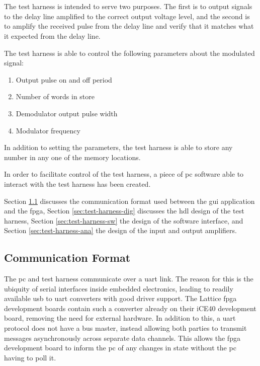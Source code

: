 \chapter{} \label{sec:test-harness-design}

The test harness is intended to serve two purposes. The first is to output signals to the delay line amplified to the correct output voltage level, and the second is to amplify the received pulse from the delay line and verify that it matches what it expected from the delay line.

The test harness is able to control the following parameters about the modulated signal:
\begin{enumerate}
	\item Output pulse on and off period
	\item Number of words in store
	\item Demodulator output pulse width
	\item Modulator frequency
\end{enumerate}

In addition to setting the parameters, the test harness is able to store any number in any one of the memory locations.

In order to facilitate control of the test harness, a piece of \gls{pc} software able to interact with the test harness has been created.

Section \ref{sec:test-harness-comms} discusses the communication format used between the \gls{gui} application and the \gls{fpga}, Section \ref{sec:test-harness-dig} discusses the \gls{hdl} design of the test harness, Section \ref{sec:test-harness-sw} the design of the software interface, and Section \ref{sec:test-harness-ana} the design of the input and output amplifiers.

\section{Communication Format} \label{sec:test-harness-comms}
The \gls{pc} and test harness communicate over a \gls{uart} link. The reason for this is the ubiquity of serial interfaces inside embedded electronics, leading to readily available \gls{usb} to \gls{uart} converters with good driver support. The Lattice \gls{fpga} development boards contain such a converter already on their iCE40 development board, removing the need for external hardware. In addition to this, a \gls{uart} protocol does not have a bus master, instead allowing both parties to transmit messages asynchronously across separate data channels. This allows the \gls{fpga} development board to inform the \gls{pc} of any changes in state without the \gls{pc} having to poll it.

